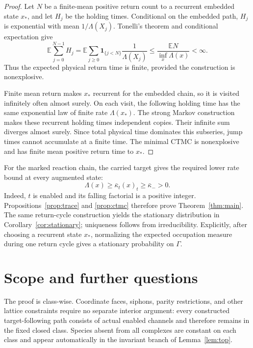 \begin{proof}
Let \(N\) be a finite-mean positive return count to a recurrent embedded state
\(x_*\), and let \(H_j\) be the holding times.  Conditional on the embedded
path, \(H_j\) is exponential with mean \(1/\Lambda(X_j)\).  Tonelli's theorem
and conditional expectation give
\[
 \mathbb E\sum_{j=0}^{N-1}H_j
 =\mathbb E\sum_{j\ge0}\mathbf1_{\{j<N\}}
   \frac1{\Lambda(X_j)}
 \le\frac{\mathbb EN}{\inf_x\Lambda(x)}<\infty.
\]
Thus the expected physical return time is finite, provided the construction
is nonexplosive.

Finite mean return makes \(x_*\) recurrent for the embedded chain, so it is
visited infinitely often almost surely.  On each visit, the following
holding time has the same exponential law of finite rate \(\Lambda(x_*)\).
The strong Markov construction makes these recurrent holding times
independent copies.  Their infinite sum diverges almost surely.  Since total
physical time dominates this subseries, jump times cannot accumulate at a
finite time.  The minimal CTMC is nonexplosive and has finite mean positive
return time to \(x_*\).
\end{proof}

For the marked reaction chain, the carried target gives the required lower
rate bound at every augmented state:
\begin{equation}\label{eq:rate-lower}
  \Lambda(x)\ge\bar\kappa_t(x)_t\ge\bar\kappa_->0.
\end{equation}
Indeed, \(t\) is enabled and its falling factorial is a positive integer.
Propositions~\ref{prop:trace} and \ref{prop:ctmc} therefore prove
Theorem~\ref{thm:main}.  The same return-cycle construction yields the
stationary distribution in Corollary~\ref{cor:stationary}; uniqueness follows
from irreducibility.  Explicitly, after choosing a recurrent state \(x_*\),
normalizing the expected occupation measure during one return cycle gives a
stationary probability on \(\Gamma\).

\section{Scope and further questions}\label{sec:scope}

The proof is class-wise.  Coordinate faces, siphons, parity restrictions, and
other lattice constraints require no separate interior argument: every
constructed target-following path consists of actual enabled channels and
therefore remains in the fixed closed class.  Species absent from all
complexes are constant on each class and appear automatically in the
invariant branch of Lemma~\ref{lem:top}.

